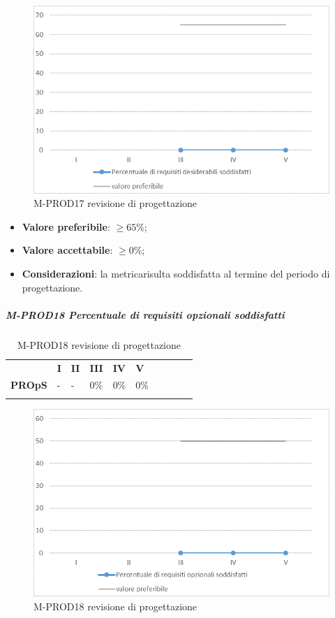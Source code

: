 \begin{figure}[H] 	
\includegraphics[width=\linewidth]{./img/grafici/RP14.png}	
\caption{M-PROD17 revisione di progettazione\glo}	
\end{figure}
\begin{itemize}
	\item \textbf{Valore preferibile}: $\ge 65\%$;
	\item \textbf{Valore accettabile}: $\ge 0\%$;
	\item \textbf{Considerazioni}: la metrica\glosp risulta soddisfatta al termine del periodo di progettazione\glo.
\end{itemize}
\subparagraph{M-PROD18 Percentuale di requisiti opzionali soddisfatti} \mbox{}
\begin{longtable}[H!] {						
		>{}p{50mm}  		
		>{}p{8mm}
		>{}p{8mm}		
		>{}p{8mm}		
		>{}p{8mm}		
		>{}p{8mm}		
		>{}p{8mm}
		>{}p{8mm}
		>{}p{8mm}
		>{}p{8mm}
	}
	\rowcolor{gray!50}
	\textbf{} & \textbf{I} & \textbf{II} & \textbf{III} & \textbf{IV} & \textbf{V} \TBstrut \\ [2mm]
	\textbf{PROpS} & - & - & 0\% & 0\% & 0\% \TBstrut \\ [2mm]
	\rowcolor{white}
	\caption{M-PROD18 revisione di progettazione\glo}
\end{longtable}
\begin{figure}[H] 	
\includegraphics[width=\linewidth]{./img/grafici/RP15.png}	
\caption{M-PROD18 revisione di progettazione\glo}	
\end{figure}
